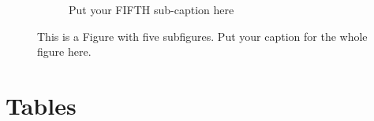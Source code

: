 \documentclass[a4paper]{article}
\begin{document}
\begin{figure}[ht]
\begin{subfigure}{.3\textwidth}
  \caption{Put your FIFTH sub-caption here}
  \label{fig:sub-second}
\end{subfigure}
\caption{This is a Figure with five subfigures. Put your caption for the whole figure here.}
\label{fig:fig-five}
\end{figure}


\section{Tables}
\label{sec:org4fc136c}



\label{sec:org97a4933}
\pagebreak



\end{document}

